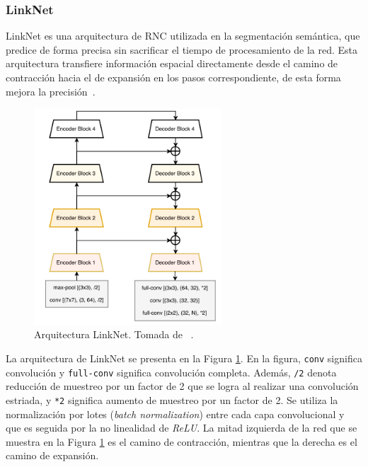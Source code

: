 \subsubsection{LinkNet}

LinkNet es una arquitectura de RNC utilizada en la segmentación semántica, que predice de forma precisa sin sacrificar el tiempo de procesamiento de la red. Esta arquitectura transfiere información espacial directamente desde el camino de contracción hacia el de expansión en los pasos correspondiente, de esta forma mejora la precisión~\cite{chaurasia2017linknet}.

\begin{figure}[ht]
	\centering
	\includegraphics[width=7cm]{./Graphics/linknet.png}
	\caption{Arquitectura LinkNet. Tomada de ~\cite{chaurasia2017linknet}.}
	\label{fig:linknet}
\end{figure}

La arquitectura de LinkNet se presenta en la Figura \ref{fig:linknet}. En la figura, \verb|conv| significa convolución y \verb|full-conv| significa convolución completa. Además, \verb|/2| denota reducción de muestreo por un factor de 2 que se logra al realizar una convolución estriada, y \verb|*2| significa aumento de muestreo por un factor de 2. Se utiliza la normalización por lotes (\textit{batch normalization}) entre cada capa convolucional y que es seguida por la no linealidad de \textit{ReLU}. La mitad izquierda de la red que se muestra en la Figura \ref{fig:linknet} es el camino de contracción, mientras que la derecha es el camino de expansión.

